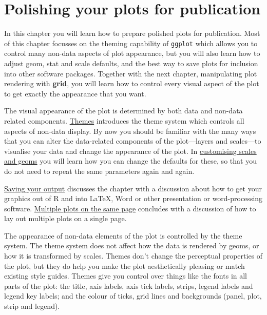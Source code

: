 \chapter{Polishing your plots for publication}\label{cha:polishing}

In this chapter you will learn how to prepare polished plots for
publication. Most of this chapter focusses on the theming capability of
\texttt{ggplot} which allows you to control many non-data aspects of
plot appearance, but you will also learn how to adjust geom, stat and
scale defaults, and the best way to save plots for inclusion into other
software packages. Together with the next chapter, manipulating plot
rendering with \textbf{grid}, you will learn how to control every visual
aspect of the plot to get exactly the appearance that you want.

The visual appearance of the plot is determined by both data and
non-data related components. \hyperref[sec:themes]{Themes} introduces
the theme system which controls all aspects of non-data display. By now
you should be familiar with the many ways that you can alter the
data-related components of the plot---layers and scales---to visualise
your data and change the appearance of the plot. In
\hyperref[sec:theme-scale-geom]{customising scales and geoms} you will
learn how you can change the defaults for these, so that you do not need
to repeat the same parameters again and again.

\hyperref[sec:saving]{Saving your output} discusses the chapter with a
discussion about how to get your graphics out of R and into LaTeX, Word
or other presentation or word-processing software.
\hyperref[sec:grid-layout]{Multiple plots on the same page} concludes
with a discussion of how to lay out multiple plots on a single page.


The appearance of non-data elements of the plot is controlled by the
theme system. The theme system does not affect how the data is rendered
by geoms, or how it is transformed by scales. Themes don't change the
perceptual properties of the plot, but they do help you make the plot
aesthetically pleasing or match existing style guides. Themes give you
control over things like the fonts in all parts of the plot: the title,
axis labels, axis tick labels, strips, legend labels and legend key
labels; and the colour of ticks, grid lines and backgrounds (panel,
plot, strip and legend).  

